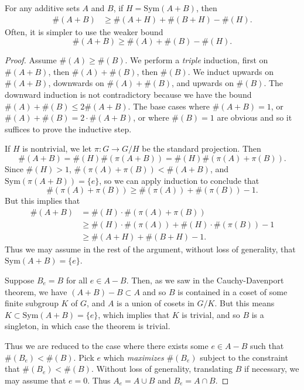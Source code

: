 \begin{theorem}
    For any additive sets $A$ and $B$, if $H = \text{Sym}(A + B)$, then
    \begin{align*}
        \#(A + B) &\geq \#(A + H) + \#(B + H) - \#(H).
    \end{align*}
    Often, it is simpler to use the weaker bound
    \[ \#(A + B) \geq \#(A) + \#(B) - \#(H). \]
\end{theorem}
\begin{proof}
    Assume $\#(A) \geq \#(B)$. We perform a \emph{triple} induction, first on $\#(A + B)$, then $\#(A) + \#(B)$, then $\#(B)$. We induct upwards on $\#(A + B)$, downwards on $\#(A) + \#(B)$, and upwards on $\#(B)$. The downward induction is not contradictory because we have the bound $\#(A) + \#(B) \leq 2 \#(A + B)$. The base cases where $\#(A + B) = 1$, or $\#(A) + \#(B) = 2 \cdot \#(A + B)$, or where $\#(B) = 1$ are obvious and so it suffices to prove the inductive step.

    If $H$ is nontrivial, we let $\pi: G \to G/H$ be the standard projection. Then
    \[ \#(A + B) = \#(H) \#(\pi(A + B)) = \#(H) \#(\pi(A) + \pi(B)). \]
    Since $\#(H) > 1$, $\#(\pi(A) + \pi(B)) < \#(A + B)$, and $\text{Sym}(\pi(A + B)) = \{ e \}$, so we can apply induction to conclude that
    \[ \#(\pi(A) + \pi(B)) \geq \#(\pi(A)) + \#(\pi(B)) - 1. \]
    But this implies that
    \begin{align*}
        \#(A + B) &= \#(H) \cdot \#(\pi(A) + \pi(B))\\
        &\geq \#(H) \cdot \#(\pi(A)) + \#(H) \cdot \#(\pi(B)) - 1 \\
        &\geq \#(A + H) + \#(B + H) - 1.
    \end{align*}
    Thus we may assume in the rest of the argument, without loss of generality, that $\text{Sym}(A + B) = \{ e \}$.

    Suppose $B_e = B$ for all $e \in A - B$. Then, as we saw in the Cauchy-Davenport theorem, we have $(A + B) - B \subset A$ and so $B$ is contained in a coset of some finite subgroup $K$ of $G$, and $A$ is a union of cosets in $G/K$. But this means $K \subset \text{Sym}(A + B) = \{ e \}$, which implies that $K$ is trivial, and so $B$ is a singleton, in which case the theorem is trivial.

    Thus we are reduced to the case where there exists some $e \in A - B$ such that $\#(B_e) < \#(B)$. Pick $e$ which \emph{maximizes} $\#(B_e)$ subject to the constraint that $\#(B_e) < \#(B)$. Without loss of generality, translating $B$ if necessary, we may assume that $e = 0$. Thus $A_e = A \cup B$ and $B_e = A \cap B$.


\end{proof}
